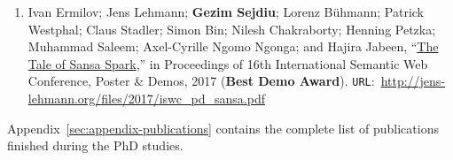 \begin{itemize}
\begin{enumerate}
    \item Ivan Ermilov; Jens Lehmann; \textbf{Gezim Sejdiu}; Lorenz Bühmann; Patrick Westphal; Claus Stadler; Simon Bin; Nilesh Chakraborty; Henning Petzka; Muhammad Saleem; Axel-Cyrille Ngomo Ngonga; and Hajira Jabeen, “\href{http://jens-lehmann.org/files/2017/iswc_pd_sansa.pdf}{The Tale of Sansa Spark},” in Proceedings of 16th International Semantic Web Conference, Poster \& Demos, 2017 ({\color{darkred}\textbf{Best Demo Award}}). \texttt{URL}:~\url{http://jens-lehmann.org/files/2017/iswc_pd_sansa.pdf}
        
    \end{enumerate}
\end{itemize}

Appendix~\ref{sec:appendix-publications} contains the complete list of publications finished during the PhD studies.

